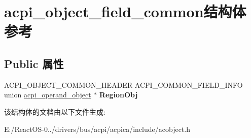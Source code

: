 \hypertarget{structacpi__object__field__common}{}\section{acpi\+\_\+object\+\_\+field\+\_\+common结构体 参考}
\label{structacpi__object__field__common}
\subsection*{Public 属性}
\begin{DoxyCompactItemize}
\item 
\mbox{\label{structacpi__object__field__common_a9cc8fa1af9ad91c1c7c6f394e9f886a1}} 
A\+C\+P\+I\+\_\+\+O\+B\+J\+E\+C\+T\+\_\+\+C\+O\+M\+M\+O\+N\+\_\+\+H\+E\+A\+D\+ER A\+C\+P\+I\+\_\+\+C\+O\+M\+M\+O\+N\+\_\+\+F\+I\+E\+L\+D\+\_\+\+I\+N\+FO union \hyperlink{unionacpi__operand__object}{acpi\+\_\+operand\+\_\+object} $\ast$ {\bfseries Region\+Obj}
\end{DoxyCompactItemize}


该结构体的文档由以下文件生成\+:\begin{DoxyCompactItemize}
\item 
E\+:/\+React\+O\+S-\/0../drivers/bus/acpi/acpica/include/acobject.\+h\end{DoxyCompactItemize}
